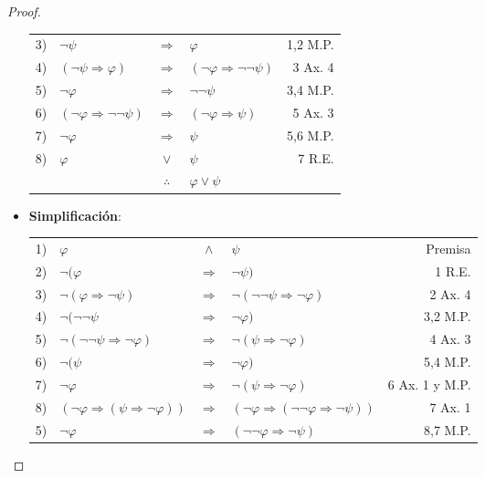 \documentclass[12pt]{report}
\theoremstyle{largebreak}
\begin{document}
\begin{proof}
\begin{itemize}
\begin{center}
\begin{tabular}{l l c l r}
                    3) & $\neg\psi$ & $\Rightarrow$ & $\varphi$ & 1,2 M.P. \\
                    4) & $(\neg\psi\Rightarrow\varphi)$ & $\Rightarrow$ & $(\neg\varphi\Rightarrow\neg\neg\psi)$ & 3 Ax. 4 \\
                    5) & $\neg\varphi$ & $\Rightarrow$ & $\neg\neg\psi$ & 3,4 M.P. \\
                    6) & $(\neg\varphi\Rightarrow\neg\neg\psi)$ & $\Rightarrow$ & $(\neg\varphi\Rightarrow\psi)$ & 5 Ax. 3 \\
                    7) & $\neg\varphi$ & $\Rightarrow$ & $\psi$ & 5,6 M.P. \\
                    8) & $\varphi$ & $\lor$ & $\psi$ & 7 R.E. \\
                    \hline
                    & & $\therefore$ & $\varphi\lor\psi$ & \\
                \end{tabular}
            \end{center}
            \item \textbf{Simplificación}:
            \begin{center}
                \begin{tabular}{l l c l r}
                    1) & $\varphi$ & $\land$ & $\psi$ & Premisa \\
                    2) & $\neg(\varphi$ & $\Rightarrow$ & $\neg\psi)$ & 1 R.E. \\
                    3) & $\neg(\varphi\Rightarrow\neg\psi)$ & $\Rightarrow$ & $\neg(\neg\neg\psi\Rightarrow\neg\varphi)$ & 2 Ax. 4 \\
                    4) & $\neg(\neg\neg\psi$ & $\Rightarrow$ & $\neg\varphi)$ & 3,2 M.P. \\
                    5) & $\neg(\neg\neg\psi\Rightarrow\neg\varphi)$ & $\Rightarrow$ & $\neg(\psi\Rightarrow\neg\varphi)$ & 4 Ax. 3 \\
                    6) & $\neg(\psi$ & $\Rightarrow$ & $\neg\varphi)$ & 5,4 M.P. \\
                    7) & $\neg\varphi$ & $\Rightarrow$ & $\neg(\psi\Rightarrow\neg\varphi)$ & 6 Ax. 1 y M.P. \\
                    8) & $(\neg\varphi\Rightarrow(\psi\Rightarrow\neg\varphi))$ & $\Rightarrow$ & $(\neg\varphi\Rightarrow(\neg\neg\varphi\Rightarrow\neg\psi))$ & 7 Ax. 1 \\
                    5) & $\neg\varphi$ & $\Rightarrow$ & $(\neg\neg\varphi\Rightarrow\neg\psi)$ & 8,7 M.P. \\

\end{tabular}
\end{center}
\end{itemize}
\end{proof}
\end{document}
